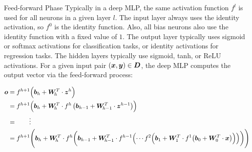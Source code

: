 %
\begin{frame}{Feed-forward Phase} 
%
Typically in a deep MLP, the same activation function $f^l$ is used for
all neurons in a given layer $l$.  The input layer always uses the identity
activation, so $f^0$ is the identity function. Also, all bias neurons also
use the identity function with a fixed value of $1$.  The output layer
typically uses sigmoid or softmax activations for classification tasks,
or identity activations for regression tasks. The hidden layers typically
use sigmoid, tanh, or ReLU activations.  %
%
For a given input pair $({\boldsymbol x}, {\boldsymbol y}) \in {\boldsymbol D}$,
the deep MLP computes the output vector via the
feed-forward process:
\begin{samepage}
\begin{align*}
    \bo & = f^{h+1}\Bigl(\bb_{h} + \bW_{\!h}^T \cdot \bz^h\Bigr)\\ 
    & = f^{h+1}\Bigl(\bb_{h} + \bW_{\!h}^T \cdot 
    f^h\lB(\bb_{h-1} + \bW_{\!h-1}^T \cdot \bz^{h-1} \rB) \Bigr)\\
    & = \qquad \vdots\\
    & = f^{h+1}\Biggl(\bb_{h} + \bW_{\!h}^T \cdot 
        f^h\biggl(\bb_{h-1} + \bW_{\!h-1}^T \cdot f^{h-1}%
            \Bigl(\cdots f^2 \Bigl(\bb_{1} +  \bW_{1}^T \cdot
                f^1 \bigl(\bb_{0} +  \bW_{0}^T \cdot \bx
\bigr) \Bigr) \Bigr) \biggr) \Biggr) 
\end{align*}
\end{samepage}
\end{frame}
